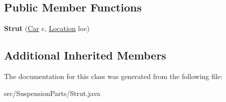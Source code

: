 \subsection*{Public Member Functions}
\begin{DoxyCompactItemize}
\item 
\hypertarget{classSuspensionParts_1_1Strut_a0166df0fda65136563b5c3c80b6cca11}{}{\bfseries Strut} (\hyperlink{classCars_1_1Car}{Car} c, \hyperlink{enumEnums_1_1Location}{Location} loc)\label{classSuspensionParts_1_1Strut_a0166df0fda65136563b5c3c80b6cca11}

\end{DoxyCompactItemize}
\subsection*{Additional Inherited Members}


The documentation for this class was generated from the following file\+:\begin{DoxyCompactItemize}
\item 
src/\+Suspension\+Parts/Strut.\+java\end{DoxyCompactItemize}
